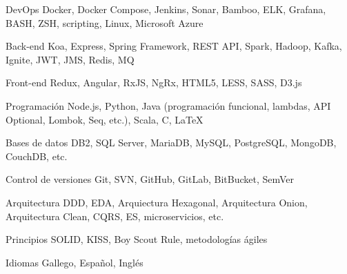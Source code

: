 
\begin{cvskills}
  \cvskill
    {DevOps}
    {Docker, Docker Compose, Jenkins, Sonar, Bamboo, ELK, Grafana, BASH, ZSH, scripting, Linux, Microsoft Azure}

  \cvskill
    {Back-end}
    {Koa, Express, Spring Framework, REST API, Spark, Hadoop, Kafka, Ignite, JWT, JMS, Redis, MQ}

  \cvskill
    {Front-end}
    {Redux, Angular, RxJS, NgRx, HTML5, LESS, SASS, D3.js}

  \cvskill
    {Programación}
    {Node.js, Python, Java (programación funcional, lambdas, API Optional, Lombok, Seq, etc.), Scala, C, LaTeX}

  \cvskill
    {Bases de datos}
    {DB2, SQL Server, MariaDB, MySQL, PostgreSQL, MongoDB, CouchDB, etc.}

  \cvskill
    {Control de versiones}
    {Git, SVN, GitHub, GitLab, BitBucket, SemVer}

  \cvskill
    {Arquitectura}
    {DDD, EDA, Arquiectura Hexagonal, Arquitectura Onion, Arquitectura Clean, CQRS, ES, microservicios, etc.}

  \cvskill
    {Principios}
    {SOLID, KISS, Boy Scout Rule, metodologías ágiles}

  \cvskill
    {Idiomas}
    {Gallego, Español, Inglés}
\end{cvskills}
